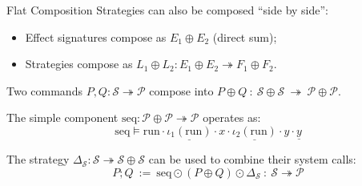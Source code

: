 \documentclass[aspectratio=1610,mathserif]{beamer}
\newcommand{\kw}[1]{\ensuremath{ \mathrm{#1} }}
\begin{document}
\begin{frame}{Flat Composition} %
  Strategies can also be composed ``side by side'':
  \begin{itemize}
    \pause
    \item Effect signatures compose as $E_1 \oplus E_2$ (direct sum);
    \pause
    \item Strategies compose as $L_1 \oplus L_2 : E_1 \oplus E_2 \twoheadrightarrow F_1 \oplus F_2$.
  \end{itemize}

  \pause \vfill
  \begin{example}
    Two commands $P, Q : \mathcal{S} \twoheadrightarrow \mathcal{P}$
    compose into
    $
      P \oplus Q \: : \:
        \mathcal{S} \oplus \mathcal{S} \: \twoheadrightarrow \:
        \mathcal{P} \oplus \mathcal{P}
    $.

    \pause \vspace{1ex}
    The simple component $\kw{seq} : \mathcal{P} \oplus \mathcal{P} \twoheadrightarrow \mathcal{P}$
    operates as:
    \[
      \kw{seq} \vDash \kw{run} \cdot \underline{\iota_1(\kw{run})} \cdot x
                               \cdot \underline{\iota_2(\kw{run})} \cdot y \cdot \underline{y}
    \]

    \pause
    The strategy
    $\Delta_\mathcal{S} : \mathcal{S} \twoheadrightarrow \mathcal{S} \oplus \mathcal{S}$
    can be used to combine their system calls:
    \[
      P \mathbin; Q \: := \:
        \kw{seq} \odot (P \oplus Q) \odot \Delta_\mathcal{S} \: : \:
        \mathcal{S} \twoheadrightarrow \mathcal{P}
    \]
  \end{example}

\end{frame}
\end{document}
